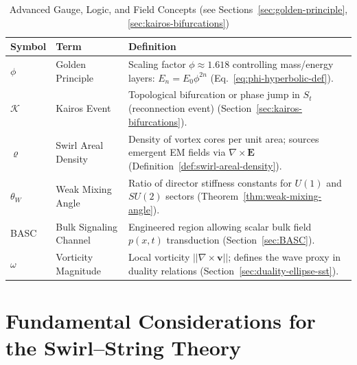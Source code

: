 \documentclass[10pt,reprint,aps,onecolumn,nofootinbib]{revtex4-2}
\begin{document}
                \begin{table}[h!]
                    \centering
                    \scriptsize
                    \caption{Advanced Gauge, Logic, and Field Concepts (see Sections~\ref{sec:golden-principle}, \ref{sec:kairos-bifurcations})}
                    \label{tab:glossary-advanced}
                    \renewcommand{\arraystretch}{1.5}
                    \begin{tabular}{|l|l|p{6cm}|}
                        \hline
                        \textbf{Symbol} & \textbf{Term} & \textbf{Definition} \\
                        \hline
                        $\phi$ & Golden Principle & Scaling factor $\phi \approx 1.618$ controlling mass/energy layers: $E_{n} = E_{0}\phi^{2n}$ (Eq.~\ref{eq:phi-hyperbolic-def}). \\
                        \hline
                        $\mathcal{K}$ & Kairos Event & Topological bifurcation or phase jump in $S_{t}$ (reconnection event) (Section~\ref{sec:kairos-bifurcations}). \\
                        \hline
                        $\varrho$ & Swirl Areal Density & Density of vortex cores per unit area; sources emergent EM fields via $\nabla \times \mathbf{E}$ (Definition~\ref{def:swirl-areal-density}). \\
                        \hline
                        $\theta_W$ & Weak Mixing Angle & Ratio of director stiffness constants for $U(1)$ and $SU(2)$ sectors (Theorem~\ref{thm:weak-mixing-angle}). \\
                        \hline
                        BASC & Bulk Signaling Channel & Engineered region allowing scalar bulk field $p(x,t)$ transduction (Section~\ref{sec:BASC}). \\
                        \hline
                        $\omega$ & Vorticity Magnitude & Local vorticity $||\nabla \times \mathbf{v}||$; defines the wave proxy in duality relations (Section~\ref{sec:duality-ellipse-sst}). \\
                        \hline
                    \end{tabular}
                \end{table}
        \newpage

    \part{Fundamental Considerations for the Swirl--String Theory}
\end{document}
